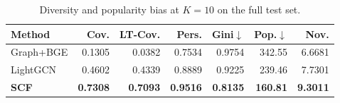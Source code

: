 \begin{table}[t]
\centering
\caption{Diversity and popularity bias at $K=10$ on the full test set.}
\label{tab:diversity}
\small
\begin{tabular}{lrrrrrr}
\toprule
Method & Cov. & LT-Cov. & Pers. & Gini$\downarrow$ & Pop.$\downarrow$ & Nov. \\
\midrule
Graph+BGE & 0.1305 & 0.0382 & 0.7534 & 0.9754 & 342.55 & 6.6681 \\
LightGCN & 0.4602 & 0.4339 & 0.8889 & 0.9225 & 239.46 & 7.7301 \\
\textbf{SCF} & \textbf{0.7308} & \textbf{0.7093} & \textbf{0.9516} & \textbf{0.8135} & \textbf{160.81} & \textbf{9.3011} \\
\bottomrule
\end{tabular}
\end{table}
